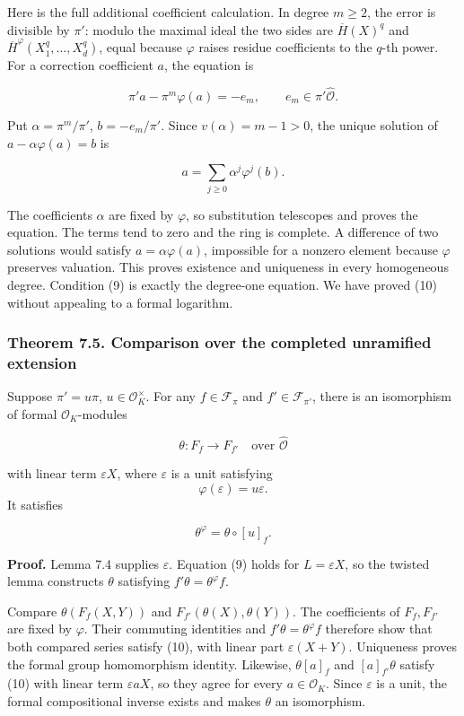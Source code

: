 \documentclass[11pt,a4paper]{article}
\begin{document}
Here is the full additional coefficient calculation. In degree
\(m\geq2\), the error is divisible by \(\pi'\): modulo the maximal ideal
the two sides are \(\overline H(X)^q\) and
\(\overline H^\varphi(X_1^q,\ldots,X_d^q)\), equal because \(\varphi\)
raises residue coefficients to the \(q\)-th power. For a correction
coefficient \(a\), the equation is

\[
\pi'a-\pi^m\varphi(a)=-e_m,\qquad e_m\in\pi'\widehat{\mathcal O}.
\]

Put \(\alpha=\pi^m/\pi'\), \(b=-e_m/\pi'\). Since \(v(\alpha)=m-1>0\),
the unique solution of \(a-\alpha\varphi(a)=b\) is

\[
a=\sum_{j\geq0}\alpha^j\varphi^j(b).
\tag{11}
\]

The coefficients \(\alpha\) are fixed by \(\varphi\), so substitution
telescopes and proves the equation. The terms tend to zero and the ring
is complete. A difference of two solutions would satisfy
\(a=\alpha\varphi(a)\), impossible for a nonzero element because
\(\varphi\) preserves valuation. This proves existence and uniqueness in
every homogeneous degree. Condition (9) is exactly the degree-one
equation. We have proved (10) without appealing to a formal logarithm.

\subsubsection{Theorem 7.5. Comparison over the completed unramified
extension}\label{theorem-7.5.-comparison-over-the-completed-unramified-extension}

Suppose \(\pi'=u\pi\), \(u\in\mathcal O_K^\times\). For any
\(f\in\mathcal F_\pi\) and \(f'\in\mathcal F_{\pi'}\), there is an
isomorphism of formal \(\mathcal O_K\)-modules

\[
\theta:F_f\longrightarrow F_{f'}
\quad\text{over }\widehat{\mathcal O}
\]

with linear term \(\varepsilon X\), where \(\varepsilon\) is a unit
satisfying \[
\varphi(\varepsilon)=u\varepsilon.
\] It satisfies

\[
\theta^\varphi=\theta\circ[u]_f.
\tag{12}
\]

\textbf{Proof.} Lemma 7.4 supplies \(\varepsilon\). Equation (9) holds
for \(L=\varepsilon X\), so the twisted lemma constructs \(\theta\)
satisfying \(f'\theta=\theta^\varphi f\).

Compare \(\theta(F_f(X,Y))\) and \(F_{f'}(\theta(X),\theta(Y))\). The
coefficients of \(F_f,F_{f'}\) are fixed by \(\varphi\). Their commuting
identities and \(f'\theta=\theta^\varphi f\) therefore show that both
compared series satisfy (10), with linear part \(\varepsilon(X+Y)\).
Uniqueness proves the formal group homomorphism identity. Likewise,
\(\theta[a]_f\) and \([a]_{f'}\theta\) satisfy (10) with linear term
\(\varepsilon aX\), so they agree for every \(a\in\mathcal O_K\). Since
\(\varepsilon\) is a unit, the formal compositional inverse exists and
makes \(\theta\) an isomorphism.
\end{document}
